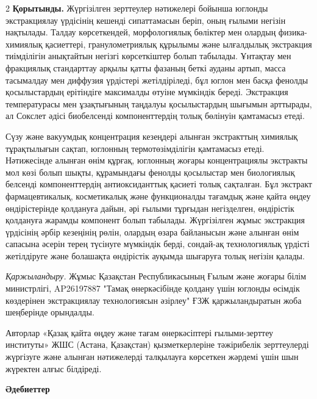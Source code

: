 \begin{multicols}{2}
{\bfseries Қорытынды.} Жүргізілген зерттеулер нәтижелері бойынша юглонды
экстракциялау үрдісінің кешенді сипаттамасын беріп, оның ғылыми негізін
нақтылады. Талдау көрсеткендей, морфологиялық бөліктер мен олардың
физика-химиялық қасиеттері, гранулометриялық құрылымы және ылғалдылық
экстракция тиімділігін анықтайтын негізгі көрсеткіштер болып табылады.
Ұнтақтау мен фракциялық стандарттау арқылы қатты фазаның беткі ауданы
артып, масса тасымалдау мен диффузия үрдістері жетілдіріледі, бұл юглон
мен басқа фенолды қосылыстардың ерітіндіге максималды өтуіне мүмкіндік
береді. Экстракция температурасы мен ұзақтығының таңдалуы қосылыстардың
шығымын арттырады, ал Сокслет әдісі биобелсенді компоненттердің толық
бөлінуін қамтамасыз етеді.

Сүзу және вакуумдық концентрация кезеңдері алынған экстракттың химиялық
тұрақтылығын сақтап, юглонның термотөзімділігін қамтамасыз етеді.
Нәтижесінде алынған өнім құрғақ, юглонның жоғары концентрациялы
экстракты мол көзі болып шықты, құрамындағы фенолды қосылыстар мен
биологиялық белсенді компоненттердің антиоксиданттық қасиеті толық
сақталған. Бұл экстракт фармацевтикалық, косметикалық және функционалды
тағамдық және қайта өңдеу өндірістерінде қолдануға дайын, әрі ғылыми
тұрғыдан негізделген, өндірістік қолдануға жарамды компонент болып
табылады. Жүргізілген жұмыс экстракция үрдісінің әрбір кезеңінің рөлін,
олардың өзара байланысын және алынған өнім сапасына әсерін терең
түсінуге мүмкіндік берді, сондай-ақ технологиялық үрдісті жетілдіруге
және болашақта өндірістік ауқымда шығаруға толық негізін қалады.

\emph{Қаржыландыру.} Жұмыс Қазақстан Республикасының Ғылым және жоғары
білім министрлігі, AP26197887 "Тамақ өнеркәсібінде қолдану үшін юглонды
өсімдік көздерінен экстракциялау технологиясын әзірлеу" ҒЗЖ
қаржыландыратын жоба шеңберінде орындалды.

Авторлар «Қазақ қайта өңдеу және тағам өнеркәсіптері ғылыми-зерттеу
институты» ЖШС (Астана, Қазақстан) қызметкерлеріне тәжірибелік
зерттеулерді жүргізуге және алынған нәтижелерді талқылауға көрсеткен
жәрдемі үшін шын жүректен алғыс білдіреді.
\end{multicols}

\begin{center}
{\bfseries Әдебиеттер}
\end{center}

